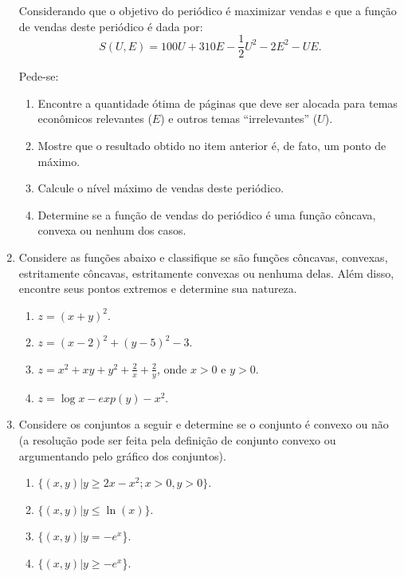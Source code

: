 \documentclass[preprintnumbers,nofootinbib,amsmath,amssymb,12pt]{article}
\begin{document}
\begin{enumerate}
Considerando que o objetivo do periódico é maximizar vendas e que a função de vendas deste periódico é dada por:
\[
S(U,E) = 100U + 310E - \frac{1}{2}U^2 - 2E^2 - UE.
\]

Pede-se:
\begin{enumerate}
    \item Encontre a quantidade ótima de páginas que deve ser alocada para temas econômicos relevantes ($E$) e outros temas ``irrelevantes'' ($U$).
    \item Mostre que o resultado obtido no item anterior é, de fato, um ponto de máximo.
    \item Calcule o nível máximo de vendas deste periódico.
    \item Determine se a função de vendas do periódico é uma função côncava, convexa ou nenhum dos casos.
\end{enumerate}

    \item Considere as funções abaixo e classifique se são funções côncavas, convexas, estritamente côncavas, estritamente convexas ou nenhuma delas. Além disso, encontre seus pontos extremos e determine sua natureza.
    \begin{enumerate}
        \item $z = (x + y)^2$.
        \item $z = (x-2)^2 + (y-5)^2 - 3$.
        \item $z = x^2 + xy + y^2 + \frac{2}{x} + \frac{2}{y}$, onde $x > 0 $ e $y > 0$.
        \item $z = \log x - exp(y) - x^2$.
    \end{enumerate}
    
    \item Considere os conjuntos a seguir e determine se o conjunto é convexo ou não (a resolução pode ser feita pela definição de conjunto convexo ou argumentando pelo gráfico dos conjuntos).
    \begin{enumerate}
        \item $\{(x,y)|y\geq 2x-x^2; x>0, y>0\}$.
        \item $\{(x,y)|y\leq \ln(x)\}$.
        \item $\{(x,y)| y = -e^x$\}.
        \item $\{(x,y)| y \geq -e^x$\}.
    \end{enumerate}
    \end{enumerate}
\end{document}
